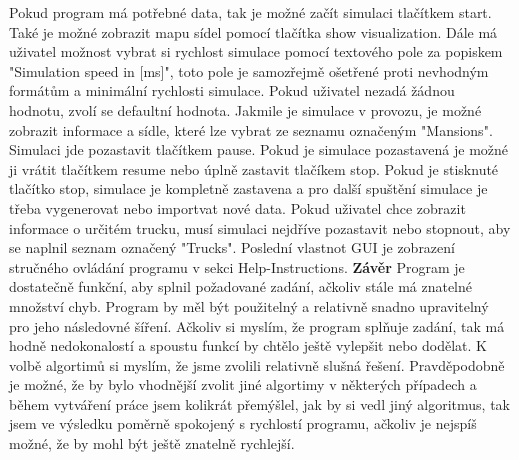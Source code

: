 \documentclass[ 12pt, a4paper]{report}
\begin{document}
Pokud program má potřebné data, tak je možné začít simulaci tlačítkem start. Také je možné zobrazit mapu sídel pomocí tlačítka show visualization. Dále má uživatel možnost vybrat si rychlost simulace pomocí textového pole za popiskem "Simulation speed in [ms]", toto pole je samozřejmě ošetřené proti nevhodným formátům a minimální rychlosti simulace. Pokud uživatel nezadá žádnou hodnotu, zvolí se defaultní hodnota. Jakmile je simulace v provozu, je možné zobrazit informace a sídle, které lze vybrat ze seznamu označeným "Mansions". Simulaci jde pozastavit tlačítkem pause. Pokud je simulace pozastavená je možné ji vrátit tlačítkem resume nebo úplně zastavit tlačíkem stop. Pokud je stisknuté tlačítko stop, simulace je kompletně zastavena a pro další spuštění simulace je třeba vygenerovat nebo importvat nové data. Pokud uživatel chce zobrazit informace o určitém trucku, musí simulaci nejdříve pozastavit nebo stopnout, aby se naplnil seznam označený "Trucks". Poslední vlastnot GUI je zobrazení stručného ovládání programu v sekci Help-Instructions.\newline\newline
{\Large\bf\noindent Závěr}\newline
Program je dostatečně funkční, aby splnil požadované zadání, ačkoliv stále má znatelné množství chyb. Program by měl být použitelný a relativně snadno upravitelný pro jeho následovné šíření. Ačkoliv si myslím, že program splňuje zadání, tak má hodně nedokonalostí a spoustu funkcí by chtělo ještě vylepšit nebo dodělat.
K volbě algortimů si myslím, že jsme zvolili relativně slušná řešení. Pravděpodobně je možné, že by bylo vhodnější zvolit jiné algortimy v některých případech a během vytváření práce jsem kolikrát přemýšlel, jak by si vedl jiný algoritmus, tak jsem ve výsledku poměrně spokojený s rychlostí programu, ačkoliv je nejspíš možné, že by mohl být ještě znatelně rychlejší.
\end{document}
